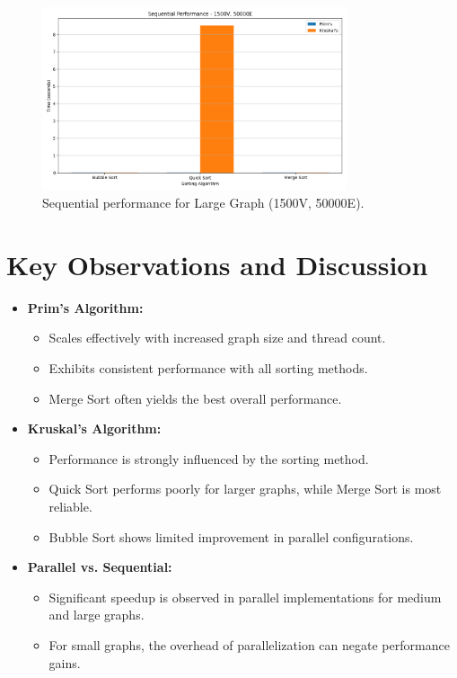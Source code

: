 \documentclass[11pt]{article}
\begin{document}
\begin{figure}[H]
    \centering
    \includegraphics[width=0.8\textwidth]{sequential_large.png}
    \caption{Sequential performance for Large Graph (1500V, 50000E).}
    \label{fig:sequential_large}
\end{figure}

\section{Key Observations and Discussion}
\begin{itemize}
    \item \textbf{Prim's Algorithm:} 
    \begin{itemize}
        \item Scales effectively with increased graph size and thread count.
        \item Exhibits consistent performance with all sorting methods.
        \item Merge Sort often yields the best overall performance.
    \end{itemize}
    \item \textbf{Kruskal's Algorithm:}
    \begin{itemize}
        \item Performance is strongly influenced by the sorting method.
        \item Quick Sort performs poorly for larger graphs, while Merge Sort is most reliable.
        \item Bubble Sort shows limited improvement in parallel configurations.
    \end{itemize}
    \item \textbf{Parallel vs. Sequential:} 
    \begin{itemize}
        \item Significant speedup is observed in parallel implementations for medium and large graphs.
        \item For small graphs, the overhead of parallelization can negate performance gains.
    \end{itemize}
\end{itemize}
\end{document}
